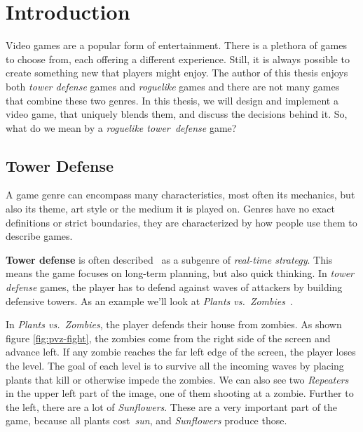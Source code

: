 \chapter{Introduction}

Video games are a popular form of entertainment.
There is a plethora of games to choose from, each offering a different experience.
Still, it is always possible to create something new that players might enjoy.
The author of this thesis enjoys both \emph{tower defense} games and \emph{roguelike} games and there are not many games that combine these two genres.
In this thesis, we will design and implement a video game, that uniquely blends them, and discuss the decisions behind it.
So, what do we mean by a \emph{roguelike tower~defense} game?

\section{Tower Defense}

A game genre can encompass many characteristics, most often its mechanics, but also its theme, art style or the medium it is played on.
Genres have no exact definitions or strict boundaries, they are characterized by how people use them to describe games.

\textbf{Tower defense} is often described~\cite{TDWiki}\cite{CITD} as a subgenre of \emph{real-time strategy}.
This means the game focuses on long-term planning, but also quick thinking.
In \emph{tower defense} games, the player has to defend against waves of attackers by building defensive towers.
As an example we'll look at \emph{Plants vs.\ Zombies}~\cite{PvZWeb}.

In \emph{Plants vs.\ Zombies}, the player defends their house from zombies.
As shown figure \ref{fig:pvz-fight}, the zombies come from the right side of the screen and advance left.
If any zombie reaches the far left edge of the screen, the player loses the level.
The goal of each level is to survive all the incoming waves by placing plants that kill or otherwise impede the zombies.
We can also see two \emph{Repeaters} in the upper left part of the image, one of them shooting at a zombie.
Further to the left, there are a lot of \emph{Sunflowers}.
These are a very important part of the game, because all plants cost~\emph{sun}, and \emph{Sunflowers} produce those.

